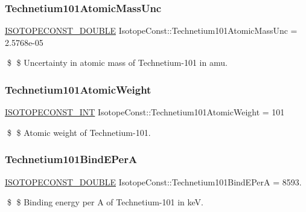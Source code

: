 \subsubsection{\texorpdfstring{Technetium101\+Atomic\+Mass\+Unc}{Technetium101AtomicMassUnc}}
{\footnotesize\ttfamily \mbox{\hyperlink{group___isotope_const-_macros_ga8f45a7272ce02c0b4c65c44636ed719a}{I\+S\+O\+T\+O\+P\+E\+C\+O\+N\+S\+T\+\_\+\+D\+O\+U\+B\+LE}} Isotope\+Const\+::\+Technetium101\+Atomic\+Mass\+Unc = 2.\+5768e-\/05}

\$ \$ Uncertainty in atomic mass of Technetium-\/101 in amu. \mbox{\label{group___isotope_const-_technetium-_tc101_gaa4cef41029bc65f91b25e1aff48a8e3a}} 
\subsubsection{\texorpdfstring{Technetium101\+Atomic\+Weight}{Technetium101AtomicWeight}}
{\footnotesize\ttfamily \mbox{\hyperlink{group___isotope_const-_macros_ga5f18360b3e99483a35c32d789e62621c}{I\+S\+O\+T\+O\+P\+E\+C\+O\+N\+S\+T\+\_\+\+I\+NT}} Isotope\+Const\+::\+Technetium101\+Atomic\+Weight = 101}

\$ \$ Atomic weight of Technetium-\/101. \mbox{\label{group___isotope_const-_technetium-_tc101_ga1535444c652999706285b7ca87a2b0d0}} 
\subsubsection{\texorpdfstring{Technetium101\+Bind\+E\+PerA}{Technetium101BindEPerA}}
{\footnotesize\ttfamily \mbox{\hyperlink{group___isotope_const-_macros_ga8f45a7272ce02c0b4c65c44636ed719a}{I\+S\+O\+T\+O\+P\+E\+C\+O\+N\+S\+T\+\_\+\+D\+O\+U\+B\+LE}} Isotope\+Const\+::\+Technetium101\+Bind\+E\+PerA = 8593.}

\$ \$ Binding energy per A of Technetium-\/101 in keV. \mbox{\label{group___isotope_const-_technetium-_tc101_ga7d20104635f1580b55751163f744df41}} 
